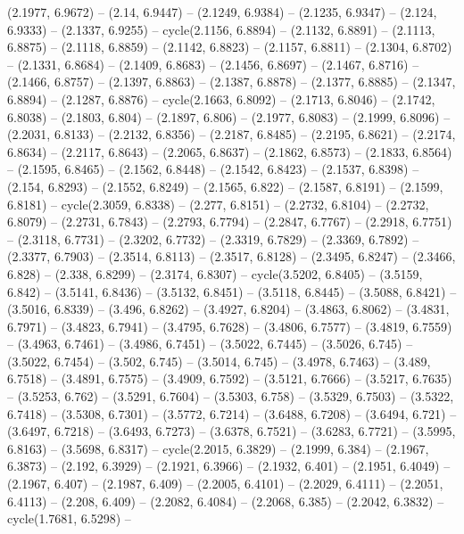 {  (2.1977, 6.9672) -- (2.14, 6.9447) -- (2.1249, 6.9384) -- (2.1235, 6.9347) -- 
  (2.124, 6.9333) -- (2.1337, 6.9255) -- cycle(2.1156, 6.8894) -- (2.1132, 
  6.8891) -- (2.1113, 6.8875) -- (2.1118, 6.8859) -- (2.1142, 6.8823) -- 
  (2.1157, 6.8811) -- (2.1304, 6.8702) -- (2.1331, 6.8684) -- (2.1409, 6.8683) 
  -- (2.1456, 6.8697) -- (2.1467, 6.8716) -- (2.1466, 6.8757) -- (2.1397, 
  6.8863) -- (2.1387, 6.8878) -- (2.1377, 6.8885) -- (2.1347, 6.8894) -- 
  (2.1287, 6.8876) -- cycle(2.1663, 6.8092) -- (2.1713, 6.8046) -- (2.1742, 
  6.8038) -- (2.1803, 6.804) -- (2.1897, 6.806) -- (2.1977, 6.8083) -- (2.1999, 
  6.8096) -- (2.2031, 6.8133) -- (2.2132, 6.8356) -- (2.2187, 6.8485) -- 
  (2.2195, 6.8621) -- (2.2174, 6.8634) -- (2.2117, 6.8643) -- (2.2065, 6.8637) 
  -- (2.1862, 6.8573) -- (2.1833, 6.8564) -- (2.1595, 6.8465) -- (2.1562, 
  6.8448) -- (2.1542, 6.8423) -- (2.1537, 6.8398) -- (2.154, 6.8293) -- (2.1552,
   6.8249) -- (2.1565, 6.822) -- (2.1587, 6.8191) -- (2.1599, 6.8181) -- 
  cycle(2.3059, 6.8338) -- (2.277, 6.8151) -- (2.2732, 6.8104) -- (2.2732, 
  6.8079) -- (2.2731, 6.7843) -- (2.2793, 6.7794) -- (2.2847, 6.7767) -- 
  (2.2918, 6.7751) -- (2.3118, 6.7731) -- (2.3202, 6.7732) -- (2.3319, 6.7829) 
  -- (2.3369, 6.7892) -- (2.3377, 6.7903) -- (2.3514, 6.8113) -- (2.3517, 
  6.8128) -- (2.3495, 6.8247) -- (2.3466, 6.828) -- (2.338, 6.8299) -- (2.3174, 
  6.8307) -- cycle(3.5202, 6.8405) -- (3.5159, 6.842) -- (3.5141, 6.8436) -- 
  (3.5132, 6.8451) -- (3.5118, 6.8445) -- (3.5088, 6.8421) -- (3.5016, 6.8339) 
  -- (3.496, 6.8262) -- (3.4927, 6.8204) -- (3.4863, 6.8062) -- (3.4831, 6.7971)
   -- (3.4823, 6.7941) -- (3.4795, 6.7628) -- (3.4806, 6.7577) -- (3.4819, 
  6.7559) -- (3.4963, 6.7461) -- (3.4986, 6.7451) -- (3.5022, 6.7445) -- 
  (3.5026, 6.745) -- (3.5022, 6.7454) -- (3.502, 6.745) -- (3.5014, 6.745) -- 
  (3.4978, 6.7463) -- (3.489, 6.7518) -- (3.4891, 6.7575) -- (3.4909, 6.7592) --
   (3.5121, 6.7666) -- (3.5217, 6.7635) -- (3.5253, 6.762) -- (3.5291, 6.7604) 
  -- (3.5303, 6.758) -- (3.5329, 6.7503) -- (3.5322, 6.7418) -- (3.5308, 6.7301)
   -- (3.5772, 6.7214) -- (3.6488, 6.7208) -- (3.6494, 6.721) -- (3.6497, 
  6.7218) -- (3.6493, 6.7273) -- (3.6378, 6.7521) -- (3.6283, 6.7721) -- 
  (3.5995, 6.8163) -- (3.5698, 6.8317) -- cycle(2.2015, 6.3829) -- (2.1999, 
  6.384) -- (2.1967, 6.3873) -- (2.192, 6.3929) -- (2.1921, 6.3966) -- (2.1932, 
  6.401) -- (2.1951, 6.4049) -- (2.1967, 6.407) -- (2.1987, 6.409) -- (2.2005, 
  6.4101) -- (2.2029, 6.4111) -- (2.2051, 6.4113) -- (2.208, 6.409) -- (2.2082, 
  6.4084) -- (2.2068, 6.385) -- (2.2042, 6.3832) -- cycle(1.7681, 6.5298) -- 
}
